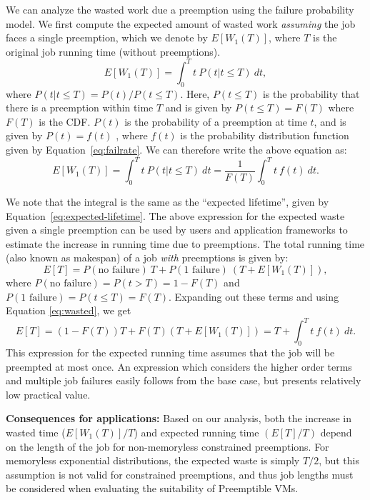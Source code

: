 \documentclass[sigconf]{acmart} %
\begin{document}
We can analyze the wasted work due a preemption using the failure probability model.
We first compute the expected amount of wasted work \emph{assuming} the job faces a single preemption, which we denote by $E[W_1(T)]$, where $T$ is the original job running time (without preemptions).
\begin{equation}
E[W_1(T)] = \int_0^{T} t~P(t | t \leq T)~dt , 
\end{equation}
where $P(t|t\leq T) = P(t) / P(t \leq T)$. Here, $P(t\leq T)$ is the probability that there is a preemption within time $T$ and is given by $P(t \leq T) = F(T)$ where $F(T)$ is the CDF. 
$P(t)$ is the probability of a preemption at time $t$, and is given by $P(t) = f(t)$ , where $f(t)$ is the probability distribution function given by Equation~\ref{eq:failrate}.
We can therefore write the above equation as:
\begin{equation}
  E[W_1(T)] = \int_0^{T} t~P(t | t \leq T)~dt = \frac{1}{F(T)}  \int_0^{T} t~f(t)~dt.
    \label{eq:wasted}
\end{equation}

We note that the integral is the same as the ``expected lifetime'', given by Equation~\ref{eq:expected-lifetime}.
The above expression for the expected waste given a single preemption can be used by users and application frameworks to estimate the increase in running time due to preemptions. 
The total running time (also known as makespan) of a job \emph{with} preemptions is given by:
\begin{equation}
  \label{eq:tot-run-time}
  E[T] = P(\text{no failure})~T + P(\text{1 failure})~\left(T + E[W_1(T)]\right),
\end{equation}
where $P(\text{no failure}) = P(t > T) =  1- F(T)$ and $P(\text{1 failure}) = P(t \leq T) = F(T)$.
Expanding out these terms and using Equation \ref{eq:wasted}, we get
\begin{equation}
  \label{eq:tot-run-time-2}
  E[T] = \left(1-F\left(T\right)\right)T + F(T)\left(T + E[W_1(T)]\right) = T + \int_0^{T} t~f(t)~dt.         
\end{equation}
This expression for the expected running time assumes that the job will be preempted at most once.
An expression which considers the higher order terms and multiple job failures easily follows from the base case, but presents relatively low practical value.

\noindent \textbf{Consequences for applications:}
Based on our analysis, both the increase in wasted time ($E[W_1(T)]/T$) and expected running time $(E[T]/T)$ depend on the length of the job for non-memoryless constrained preemptions. 
For memoryless exponential distributions, the expected waste is simply $T/2$, but this assumption is not valid for constrained preemptions, and thus job lengths must be considered when evaluating the suitability of Preemptible VMs. 
\end{document}
